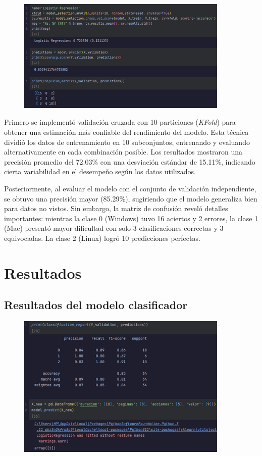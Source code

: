 \documentclass{article}
\begin{document}
\begin{figure}[H]
\centering
\includegraphics[width=0.9\textwidth]{Actividad-11/Imagen9.png}
\end{figure}

Primero se implementó validación cruzada con 10 particiones (\textit{KFold}) para obtener una estimación más confiable del rendimiento del modelo. Esta técnica dividió los datos de entrenamiento en 10 subconjuntos, entrenando y evaluando alternativamente en cada combinación posible. Los resultados mostraron una precisión promedio del 72.03\% con una desviación estándar de 15.11\%, indicando cierta variabilidad en el desempeño según los datos utilizados.

Posteriormente, al evaluar el modelo con el conjunto de validación independiente, se obtuvo una precisión mayor (85.29\%), sugiriendo que el modelo generaliza bien para datos no vistos. Sin embargo, la matriz de confusión reveló detalles importantes: mientras la clase 0 (Windows) tuvo 16 aciertos y 2 errores, la clase 1 (Mac) presentó mayor dificultad con solo 3 clasificaciones correctas y 3 equivocadas. La clase 2 (Linux) logró 10 predicciones perfectas.

\newpage

\section*{Resultados}

\subsection*{Resultados del modelo clasificador}

\begin{figure}[H]
\centering
\includegraphics[width=0.9\textwidth]{Actividad-11/Imagen10.png}
\end{figure}
\end{document}
